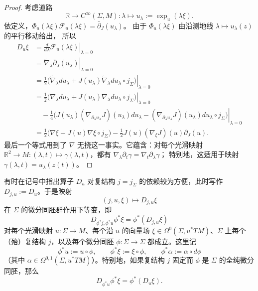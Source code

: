 \begin{proof}
考虑道路
\[
  \mathbb R\longrightarrow C^\infty(\Sigma,M):
  \lambda\longmapsto u_\lambda:=\exp_u(\lambda\xi).
\]
依定义，$\Phi_u(\lambda\xi)\mathcal F_u(\lambda\xi)=\bar\partial_J(u_\lambda)$。
由于 $\Phi_u(\lambda\xi)$ 由沿测地线 $\lambda\mapsto u_\lambda(z)$ 的平行移动给出，
所以
\[
\begin{aligned}
  D_u\xi
  &=
  \left.\frac{d}{d\lambda}\mathcal F_u(\lambda\xi)\right|_{\lambda=0}\\
  &=
  \left.\widetilde\nabla_\lambda\bar\partial_J(u_\lambda)
  \right|_{\lambda=0}\\
  &=
  \left.\frac12\bigl(
    \widetilde\nabla_\lambda du_\lambda
    +J(u_\lambda)\widetilde\nabla_\lambda du_\lambda\circ j_\Sigma
  \bigr)\right|_{\lambda=0}\\
  &=
  \left.\frac12\bigl(
    \nabla_\lambda du_\lambda
    +J(u_\lambda)\nabla_\lambda du_\lambda\circ j_\Sigma
  \bigr)\right|_{\lambda=0}\\
  &\quad
  -\left.\frac14\bigl(
    J(u_\lambda)(\nabla_{\partial_\lambda u_\lambda}J)(u_\lambda)du_\lambda
    -(\nabla_{\partial_\lambda u_\lambda}J)(u_\lambda)du_\lambda\circ j_\Sigma
  \bigr)\right|_{\lambda=0}\\
  &=
  \frac12\bigl(\nabla\xi+J(u)\nabla\xi\circ j_\Sigma\bigr)
  -\frac12J(u)(\nabla_\xi J)(u)\partial_J(u).
\end{aligned}
\]
最后一个等式用到了 $\nabla$ 无挠这一事实。它蕴含：对每个光滑映射
$\mathbb R^2\to M:(\lambda,t)\mapsto\gamma(\lambda,t)$，都有
$\nabla_\lambda\partial_t\gamma=\nabla_t\partial_\lambda\gamma$；
特别地，这适用于映射 $\gamma(\lambda,t)=u_\lambda(z(t))$。
\end{proof}

\begin{remark}[自然性]\label{rem:3-1-2}
有时在记号中指出算子 $D_u$ 对复结构 $j=j_\Sigma$ 的依赖较为方便，此时写作
$D_{j,u}:=D_u$。于是映射
\[
  (j,u,\xi)\longmapsto D_{j,u}\xi
\]
在 $\Sigma$ 的微分同胚群作用下等变，即
\begin{equation}\label{eq:3-1-5}
  D_{\phi^*j,\phi^*u}\phi^*\xi=\phi^*(D_{j,u}\xi)
\end{equation}
对每个光滑映射 $u:\Sigma\to M$、每个沿 $u$ 的向量场
$\xi\in\Omega^0(\Sigma,u^*TM)$、$\Sigma$ 上每个（殆）复结构 $j$，以及每个微分同胚
$\phi:\Sigma\to\Sigma$ 都成立。这里记
\[
  \phi^*u:=u\circ\phi,\qquad
  \phi^*\xi:=\xi\circ\phi,\qquad
  \phi^*\alpha:=\alpha\circ d\phi
\]
（其中 $\alpha\in\Omega^{0,1}(\Sigma,u^*TM)$）。特别地，如果复结构 $j$ 固定而
$\phi$ 是 $\Sigma$ 的全纯微分同胚，那么
\[
  D_{\phi^*u}\phi^*\xi=\phi^*(D_u\xi).
\]
\end{remark}

